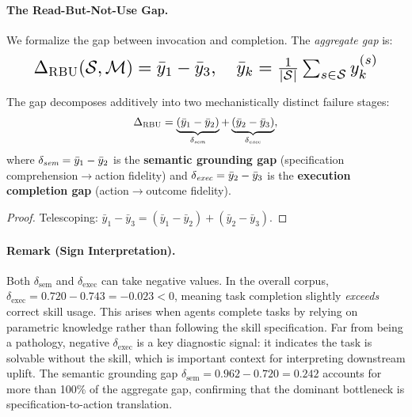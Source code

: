 \paragraph{The Read-But-Not-Use Gap.}
We formalize the gap between invocation and completion.
The \emph{aggregate \rbu gap} is:
\begin{equation}
    \resizebox{0.90\columnwidth}{!}{$\displaystyle
        \Delta_{\textsc{RBU}}(\mathcal{S}, \mathcal{M}) = \bar{y}_1 - \bar{y}_3, \quad
        \bar{y}_k = \tfrac{1}{|\mathcal{S}|}\textstyle\sum_{s \in \mathcal{S}} y_k^{(s)}
    $}
    \label{eq:rbu}
\end{equation}

\begin{proposition}
\label{prop:decomp}
The \rbu gap decomposes additively into two mechanistically distinct failure stages:
\begin{equation}
    \Delta_{\textsc{RBU}} = \underbrace{(\bar{y}_1 - \bar{y}_2)}_{\delta_{\emph{sem}}} + \underbrace{(\bar{y}_2 - \bar{y}_3)}_{\delta_{\emph{exec}}},
    \label{eq:decomp}
\end{equation}
where $\delta_{\emph{sem}} = \bar{y}_1 - \bar{y}_2$ is the \textbf{semantic grounding gap} (specification comprehension$\to$action fidelity) and $\delta_{\emph{exec}} = \bar{y}_2 - \bar{y}_3$ is the \textbf{execution completion gap} (action$\to$outcome fidelity).
\end{proposition}
\begin{proof}
Telescoping: $\bar{y}_1 - \bar{y}_3 = (\bar{y}_1 - \bar{y}_2) + (\bar{y}_2 - \bar{y}_3)$.
\end{proof}

\paragraph{Remark (Sign Interpretation).}
Both $\delta_{\text{sem}}$ and $\delta_{\text{exec}}$ can take negative values.
In the overall corpus, $\delta_{\text{exec}} = 0.720 - 0.743 = -0.023 < 0$, meaning task completion slightly \emph{exceeds} correct skill usage.
This arises when agents complete tasks by relying on parametric knowledge rather than following the skill specification.
Far from being a pathology, negative $\delta_{\text{exec}}$ is a key diagnostic signal: it indicates the task is solvable without the skill, which is important context for interpreting downstream uplift.
The semantic grounding gap $\delta_{\text{sem}} = 0.962 - 0.720 = 0.242$ accounts for more than 100\% of the aggregate \rbu gap, confirming that the dominant bottleneck is specification-to-action translation.


